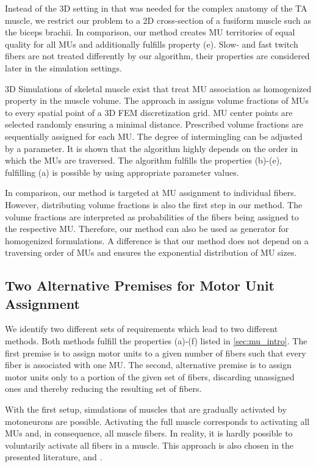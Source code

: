 Instead of the 3D setting in \cite{Roehrle2012} that was needed for the complex anatomy of the TA muscle, we restrict our problem to a 2D cross-section of a fusiform muscle such as the biceps brachii. In comparison, our method creates MU territories of equal quality for all MUs and additionally fulfills property (e). Slow- and fast twitch fibers are not treated differently by our algorithm, their properties are considered later in the simulation settings.

3D Simulations of skeletal muscle exist that treat MU association as homogenized property in the muscle volume. The approach in \cite{harry2018} assigns volume fractions of MUs to every spatial point of a 3D FEM discretization grid. MU center points are selected randomly ensuring a minimal distance. Prescribed volume fractions are sequentially assigned for each MU. The degree of intermingling can be adjusted by a parameter. It is shown that the algorithm highly depends on the order in which the MUs are traversed. The algorithm fulfills the properties (b)-(e), fulfilling (a) is possible by using appropriate parameter values.

In comparison, our method is targeted at MU assignment to individual fibers. However, distributing volume fractions is also the first step in our method. The volume fractions are interpreted as probabilities of the fibers being assigned to the respective MU. Therefore, our method can also be used as generator for homogenized formulations. A difference is that our method does not depend on a traversing order of MUs and ensures the exponential distribution of MU sizes.

\subsection{Two Alternative Premises for Motor Unit Assignment}

We identify two different sets of requirements which lead to two different methods.
Both methods fulfill the properties (a)-(f) listed in \cref{sec:mu_intro}.
The first premise is to assign motor units to a given number of fibers such that every fiber is associated with one MU. The second, alternative premise is to assign motor units only to a portion of the given set of fibers, discarding unassigned ones and thereby reducing the resulting set of fibers.

With the first setup, simulations of muscles that are gradually activated by motoneurons are possible. Activating the full muscle corresponds to activating all MUs and, in consequence, all muscle fibers. In reality, it is hardly possible to voluntarily activate all fibers in a muscle. This approach is also chosen in the presented literature, \cite{Roehrle2012} and \cite{harry2018}.

